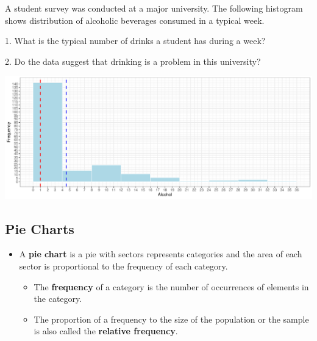 \begin{exercise}
A student survey was conducted at a major university. The following
histogram shows distribution of alcoholic beverages consumed in a
typical week. 

1. What is the typical number of drinks a student has
during a week? 

2. Do the data suggest that drinking is a problem in this
university?

\begin{fullwidth}
\begin{center}
  \includegraphics[width=\linewidth]{figure-latex/unnamed-chunk-2-6-1}
\end{center}
\end{fullwidth}
\end{exercise}
\vspace*{5\baselineskip}

\hypertarget{pie-charts}{%
\subsection{Pie Charts}\label{pie-charts}}

\begin{itemize}
\item
  A \textbf{pie chart} is a pie with sectors represents categories and
  the area of each sector is proportional to the frequency of each
  category.

  \begin{itemize}
  \item
    The \textbf{frequency} of a category is the number of occurrences of
    elements in the category.
  \item
    The proportion of a frequency to the size of the population or the
    sample is also called the \textbf{relative frequency}.
  \end{itemize}
\end{itemize}

